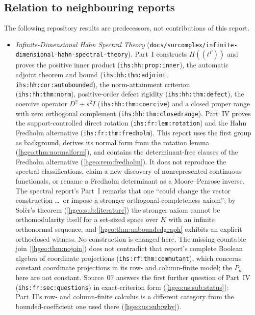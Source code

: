 \documentclass[11pt,letterpaper]{article}
\numberwithin{equation}{section}
\theoremstyle{definition}
\theoremstyle{remark}
\newcommand{\K}{K}
\newcommand{\replabel}[1]{\nolinkurl{#1}}
\newcommand{\fn}[1]{\nolinkurl{#1}}
\begin{document}
\subsection{Relation to neighbouring reports}\label{hgeo:sub:neighbours}
The following repository results are predecessors, not contributions of this
report.
\begin{itemize}[leftmargin=*]
\item \emph{Infinite-Dimensional Hahn Spectral Theory}
(\fn{docs/surcomplex/infinite-dimensional-hahn-spectral-theory}). Part~I
constructs $H((t^\Gamma))$ and proves the positive inner product
(\replabel{ihs:hh:prop:inner}), the automatic adjoint theorem and bound
(\replabel{ihs:hh:thm:adjoint}, \replabel{ihs:hh:cor:autobounded}), the
norm-attainment criterion (\replabel{ihs:hh:thm:norm}), positive-order defect
rigidity (\replabel{ihs:hh:thm:defect}), the coercive operator $D^2+s^2I$
(\replabel{ihs:hh:thm:coercive}) and a closed proper range with zero
orthogonal complement (\replabel{ihs:hh:thm:closedrange}). Part~IV proves
the support-controlled direct rotation (\replabel{ihs:fr:lem:rotation}) and the
Hahn Fredholm alternative (\replabel{ihs:fr:thm:fredholm}). This report uses
the first group as background, derives its normal form from the rotation lemma
(\cref{hgeo:thm:normalform}), and contains the determinant-free clauses of the
Fredholm alternative (\cref{hgeo:rem:fredholm}). It does not reproduce the
spectral classifications, claim a new discovery of nonrepresented continuous
functionals, or rename a Fredholm determinant as a Moore--Penrose inverse.
The spectral report's Part~I remarks that one ``could change the vector
construction \ldots\ or impose a stronger orthogonal-completeness axiom'';
by Sol\`er's theorem (\cref{hgeo:sub:literature}) the stronger axiom cannot be
orthomodularity itself for a set-sized space over $\K$ with an infinite
orthonormal sequence, and \cref{hgeo:thm:unboundedgraph} exhibits an
explicit orthoclosed witness. No construction is changed here. The missing
countable join (\cref{hgeo:thm:nojoin}) does not contradict that report's
complete Boolean algebra of coordinate projections
(\replabel{ihs:rf:thm:commutant}), which concerns constant coordinate
projections in its row- and column-finite model; the $P_n$ here are not
constant. Source~07 answers the first further question of Part~IV
(\replabel{ihs:fr:sec:questions}) in exact-criterion form
(\cref{hgeo:us:sub:status}); Part~II's row- and column-finite calculus is a
different category from the bounded-coefficient one used there
(\cref{hgeo:us:sub:why}).

\end{itemize}
\end{document}
